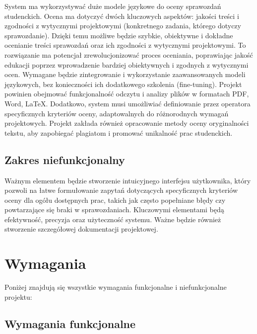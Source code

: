 \documentclass[a4paper, 12pt]{article}
\begin{document}
System ma wykorzystywać duże modele językowe do oceny sprawozdań studenckich.
Ocena ma dotyczyć dwóch kluczowych aspektów: jakości treści i zgodności z wytycznymi projektowymi (konkretnego zadania,
którego dotyczy sprawozdanie).
Dzięki temu możliwe będzie szybkie, obiektywne i dokładne ocenianie treści sprawozdań oraz ich zgodności z wytycznymi projektowymi.
To rozwiązanie ma potencjał zrewolucjonizować proces oceniania, poprawiając jakość edukacji poprzez wprowadzenie bardziej obiektywnych i zgodnych z wytycznymi ocen.
Wymagane będzie zintegrowanie i wykorzystanie zaawansowanych modeli językowych, bez konieczności ich dodatkowego
szkolenia (fine-tuning).
Projekt powinien obejmować funkcjonalność odczytu i analizy plików w formatach PDF, Word, LaTeX. Dodatkowo, system musi
umożliwiać definiowanie przez operatora specyficznych kryteriów oceny, adaptowalnych do różnorodnych wymagań
projektowych.
Projekt zakłada również opracowanie metody oceny oryginalności tekstu, aby zapobiegać plagiatom i promować unikalność
prac studenckich.

\subsection{Zakres niefunkcjonalny}
Ważnym elementem będzie stworzenie intuicyjnego interfejsu użytkownika, który pozwoli na łatwe formułowanie zapytań
dotyczących specyficznych kryteriów oceny dla ogółu dostępnych prac, takich jak często popełniane błędy czy powtarzające
się braki w sprawozdaniach.
Kluczowymi elementami będą efektywność, precyzja oraz użyteczność systemu.
Ważne będzie również stworzenie szczegółowej dokumentacji projektowej.

\section{Wymagania}
Poniżej znajdują się wszystkie wymagania funkcjonalne i niefunkcjonalne projektu:

\subsection{Wymagania funkcjonalne}
\end{document}
